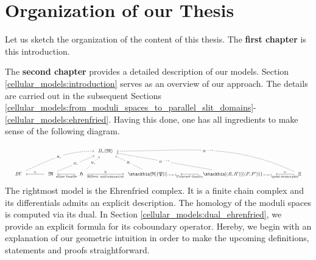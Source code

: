 \section{Organization of our Thesis}

Let us sketch the organization of the content of this thesis. The {\bfseries first chapter} is this introduction.

The {\bfseries second chapter} provides a detailed description of our models.
Section \ref{cellular_models:introduction} serves as an overview of our approach.
The details are carried out in the subsequent Sections \ref{cellular_models:from_moduli_spaces_to_parallel_slit_domains}-\ref{cellular_models:ehrenfried}.
Having this done, one has all ingredients to make sense of the following diagram.
\[
    \resizebox{\linewidth}{!}{
        \begin{tikzcd}[row sep=7.5ex, scale=1.3, ampersand replacement=\&]
            \&\&\&\&\&H_\ast(\mathfrak M) \\
            B\Gamma \arrow[<-, shorten <=1ex, shorten >=1ex]{rr}{\simeq} \arrow[dashed, out=25, in=180, shorten <=1ex, shorten >=1ex]{rrrrru}[description]{H_\ast} \&\&
            \mathfrak M \arrow[<-, shorten <=1ex, shorten >=1ex]{rr}[swap]{\text{affine bundle}} \arrow[dashed, shorten <=1ex, shorten >=1ex]{rrru}[description]{H_\ast} \&\&
            \mathfrak H \arrow[shorten <=1ex, shorten >=1ex]{rr}{\cong}[swap]{\text{Hilbert uniformization}} \arrow[dashed, shorten <=1ex, shorten >=1ex]{ru}[description]{H_\ast} \&\&
            \stackbin[\mathfrak R]{\mathfrak P}{\scriptscriptstyle{resp.}} \arrow[<-, shorten <=1ex, shorten >=1ex]{rr}[swap]{\text{Poincaré duality}} \arrow[dashed, shorten <=1ex, shorten >=1ex]{lu}[description]{H_\ast} \&\&
            \stackbin[(R,R')]{(P,P')}{\scriptscriptstyle{resp.}} \arrow[<-, shorten <=1ex, shorten >=1ex]{rr}{\simeq}[swap]{\text{quasi-isomorphic}} \arrow[dashed, shorten <=1ex, shorten >=1ex]{lllu}[description]{H^{\ldots-\ast}} \&\&
            \E \arrow[dashed, out=155, in=0, shorten <=1ex, shorten >=1ex]{lllllu}[description]{H^{\ldots-\ast}}
        \end{tikzcd}
    }
\]
The rightmost model is the Ehrenfried complex.
It is a finite chain complex and its differentials admits an explicit description.
The homology of the moduli spaces is computed via its dual.
In Section \ref{cellular_models:dual_ehrenfried}, we provide an explicit formula for its coboundary operator.
Hereby, we begin with an explanation of our geometric intuition in order to make the upcoming definitions, statements and proofs straightforward.

